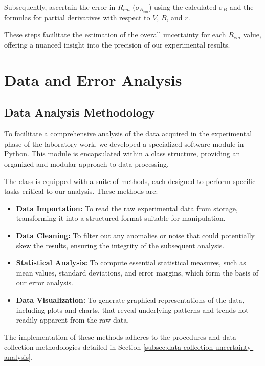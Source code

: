 \documentclass{article}
\begin{document}
Subsequently, ascertain the error in \(R_{em}\) (\(\sigma_{R_{em}}\)) using the calculated \(\sigma_B\) and the formulas for partial derivatives with respect to \(V\), \(B\), and \(r\).

These steps facilitate the estimation of the overall uncertainty for each \(R_{em}\) value, offering a nuanced insight into the precision of our experimental results.


\section{Data and Error Analysis}

\subsection{Data Analysis Methodology}

To facilitate a comprehensive analysis of the data acquired in the experimental phase of the laboratory work, we developed a specialized software module in Python. This module is encapsulated within a class structure, providing an organized and modular approach to data processing.

The class is equipped with a suite of methods, each designed to perform specific tasks critical to our analysis. These methods are:

\begin{itemize}
  \item \textbf{Data Importation:} To read the raw experimental data from storage, transforming it into a structured format suitable for manipulation.
  \item \textbf{Data Cleaning:} To filter out any anomalies or noise that could potentially skew the results, ensuring the integrity of the subsequent analysis.
  \item \textbf{Statistical Analysis:} To compute essential statistical measures, such as mean values, standard deviations, and error margins, which form the basis of our error analysis.
  \item \textbf{Data Visualization:} To generate graphical representations of the data, including plots and charts, that reveal underlying patterns and trends not readily apparent from the raw data.
\end{itemize}

The implementation of these methods adheres to the procedures and data collection methodologies detailed in Section \ref{subsec:data-collection-uncertainty-analysis}.
\end{document}
